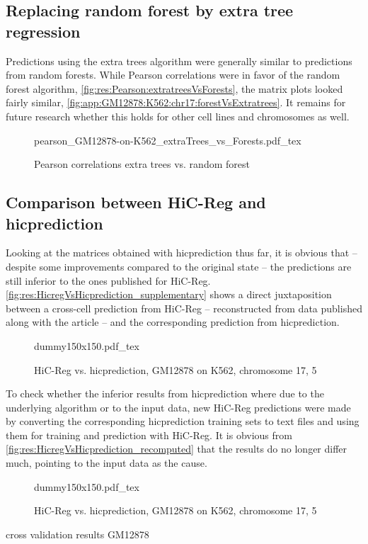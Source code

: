 \subsection{Replacing random forest by extra tree regression} \label{sec:res:extratrees}
Predictions using the extra trees algorithm were generally similar to predictions from random forests.
While Pearson correlations were in favor of the random forest algorithm, \autoref{fig:res:Pearson:extratreesVsForests},
the matrix plots looked fairly similar, \autoref{fig:app:GM12878:K562:chr17:forestVsExtratrees}.
It remains for future research whether this holds for other cell lines and chromosomes as well.
\begin{figure}[hb]
  \centering
  \scriptsize
  {pearson_GM12878-on-K562_extraTrees_vs_Forests.pdf_tex}
  \caption{Pearson correlations extra trees vs. random forest}
  \label{fig:res:Pearson:extratreesVsForests}
\end{figure}

\subsection{Comparison between HiC-Reg and hicprediction} \label{sec:res:compare}
Looking at the matrices obtained with hicprediction thus far, it is obvious that -- despite some improvements compared to the original state -- 
the predictions are still inferior to the ones published for HiC-Reg.
\autoref{fig:res:HicregVsHicprediction_supplementary} shows a direct juxtaposition between a cross-cell prediction from HiC-Reg -- 
reconstructed from data published along with the article \cite{Zhang2019} --
and the corresponding prediction from hicprediction.
\begin{figure}[hb]
{dummy150x150.pdf_tex}
\caption{HiC-Reg vs. hicprediction, GM12878 on K562, chromosome 17, \SI{5}{\kilo\bp}}
\label{fig:res:HicregVsHicprediction_supplementary}
\end{figure}

To check whether the inferior results from hicprediction where due to the underlying algorithm or to the input data,
new HiC-Reg predictions were made by converting the corresponding hicprediction training sets to text files and using them for
training and prediction with HiC-Reg.
It is obvious from \autoref{fig:res:HicregVsHicprediction_recomputed} that the results do no longer differ much,
pointing to the input data as the cause.
\begin{figure}[hb]
{dummy150x150.pdf_tex}
\caption{HiC-Reg vs. hicprediction, GM12878 on K562, chromosome 17, \SI{5}{\kilo\bp}}
\label{fig:res:HicregVsHicprediction_recomputed}
\end{figure}
\xxx cross validation results GM12878

